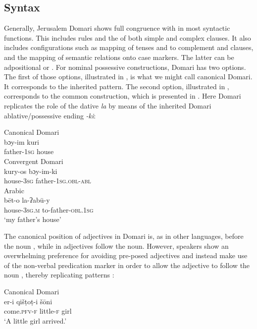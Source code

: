 \documentclass[output=paper]{langsci/langscibook}
\begin{document}
\subsection{Syntax}

Generally, Jerusalem Domari shows full congruence with   in most syntactic functions. This includes  rules and the  of both simple and complex clauses. It also includes configurations such as mapping of tenses and  to complement and  clauses, and the mapping of semantic relations onto case markers. The latter can be adpositional or . For nominal possessive constructions, Domari has two options. The first of those options, illustrated in , is what we might call canonical Domari. It corresponds to the inherited  pattern. The second option, illustrated in , corresponds to the common   construction, which is presented in . Here Domari replicates the role of the  dative  \textit{la} by means of the inherited Domari ablative/possessive  ending \textit{-ki}:

\ea
\ea
{{Canonical} Domari}\\
\gll bɔy-im kuri    \\
     father-\textsc{1sg} house\\ \label{kuri}
\ex
{Convergent Domari}\\
\gll kury-os bɔy-im-ki  \\
       house-\textsc{3sg} father-\textsc{1sg.obl-abl}\\ \label{boy}
\ex
{Arabic}\\
\gll bēt-o la-ʔabū-y  \\
       house-\textsc{3sg.m} to-father-\textsc{obl.1sg}\\
\glt   ‘my father’s house’ \label{bett}
\z
\z

The canonical position of adjectives in Domari is, as in other  languages, before the noun , while in  adjectives follow the noun. However, speakers show an overwhelming preference for avoiding pre-posed adjectives and instead make use of the non-verbal predication marker in order to allow the adjective to follow the noun , thereby replicating   patterns :

\ea\label{girls}
\ea
{{Canonical} Domari}\\
\gll er-i qišṭoṭ-i šōni  \\
       come.\textsc{pfv-f} little-\textsc{f} girl\\
\glt   ‘A little girl arrived.’ \label{girla}
\end{document}
